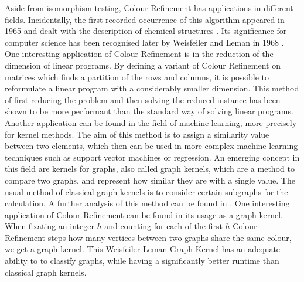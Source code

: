 Aside from isomorphism testing, Colour Refinement has applications in different fields.
Incidentally, the first recorded occurrence of this algorithm appeared in 1965 and dealt with the description of chemical structures \cite{morgan1965GenerationUnique}.
Its significance for computer science has been recognised later by Weisfeiler and Leman in 1968 \cite{weisfeiler1968reduction}.
One interesting application of Colour Refinement is in the reduction of the dimension of linear programs.
By defining a variant of Colour Refinement on matrices which finds a partition of the rows and columns, it is possible to reformulate a linear program with a considerably smaller dimension. 
This method of first reducing the problem and then solving the reduced instance has been shown to be more performant than the standard way of solving linear programs. \cite{grohe2014DimensionReduction}
Another application can be found in the field of machine learning, more precisely for kernel methods.
The aim of this method is to assign a similarity value between two elements, which then can be used in more complex machine learning techniques such as support vector machines or regression.
An emerging concept in this field are kernels for graphs, also called graph kernels, which are a method to compare two graphs, and represent how similar they are with a single value.
The usual method of classical graph kernels is to consider certain subgraphs for the calculation.
A further analysis of this method can be found in \cite{vishwanathan2010graph}.
One interesting application of Colour Refinement can be found in its usage as a graph kernel.
When fixating an integer $h$ and counting for each of the first $h$ Colour Refinement steps how many vertices between two graphs share the same colour, we get a graph kernel.
This Weisfeiler-Leman Graph Kernel has an adequate ability to to classify graphs, while having a significantly better runtime than classical graph kernels. \cite{grohe2021ColorRefinement}

